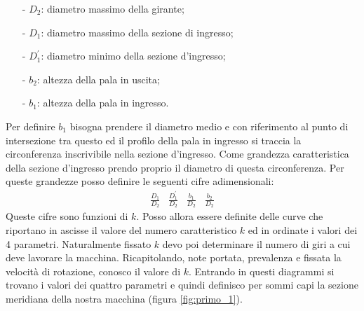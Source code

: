 \begin{itemize}
\item[-]$D_2$: diametro massimo della girante;\\
\item[-]$D_1$: diametro massimo della sezione di ingresso;\\
\item[-]$D_1^{'}$: diametro minimo della sezione d'ingresso;\\
\item[-]$b_2$: altezza della pala in uscita;\\
\item[-]$b_1$: altezza della pala in ingresso.
\end{itemize}
Per definire $b_1$ bisogna prendere il diametro medio e con riferimento al punto di intersezione tra questo ed il profilo della pala in ingresso si traccia la circonferenza inscrivibile nella sezione d’ingresso. Come grandezza caratteristica della sezione d’ingresso prendo proprio il diametro di questa circonferenza.
Per queste grandezze posso definire le seguenti cifre adimensionali:
\begin{align*}
\frac{D_1}{D_2} \; \; \; \frac{D_1^{'}}{D_2} \; \; \; \frac{b_1}{D_2} \; \; \; \frac{b_2}{D_2} 
\end{align*}
Queste cifre sono funzioni di $k$. Posso allora essere definite delle curve che riportano in ascisse il valore del numero caratteristico $k$ ed in ordinate i valori dei 4 parametri.
Naturalmente fissato $k$ devo poi determinare il numero di giri a cui deve lavorare la macchina. 
Ricapitolando, note portata, prevalenza e fissata la velocità di rotazione, conosco il valore di $k$. Entrando in questi diagrammi si trovano i valori dei quattro parametri e quindi definisco per sommi capi la sezione meridiana della nostra macchina (figura \ref{fig:primo_1}).

